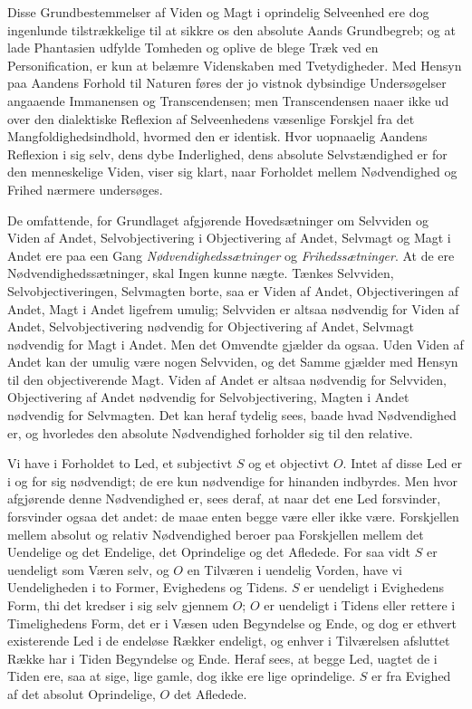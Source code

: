 \documentclass[12pt]{book}
\newcommand{\apage}[1]{\marginnote{\footnotesize\textit{[#1]}}}
\begin{document}
\apage{222} Disse Grundbestemmelser af Viden og Magt i oprindelig Selveenhed ere dog
ingenlunde tilstrækkelige til at sikkre os den absolute Aands Grundbegreb;
og at lade Phantasien udfylde Tomheden og oplive de blege Træk ved en
Personification, er kun at belæmre Videnskaben med Tvetydigheder. Med Hensyn
paa Aandens Forhold til Naturen føres der jo vistnok dybsindige
Undersøgelser angaaende Immanensen og Transcendensen; men Transcendensen
naaer ikke ud over den dialektiske Reflexion af Selveenhedens væsenlige
Forskjel fra det Mangfoldighedsindhold, hvormed den er identisk. Hvor
uopnaaelig Aandens Reflexion i sig selv, dens dybe Inderlighed, dens
absolute Selvstændighed er for den menneskelige Viden, viser sig klart,
naar Forholdet mellem Nødvendighed og Frihed nærmere undersøges.

De omfattende, for Grundlaget afgjørende Hovedsætninger om Selvviden og
Viden af Andet, Selvobjectivering i Objectivering af Andet, Selvmagt og Magt
i Andet ere paa een Gang \emph{Nødvendighedssætninger} og \emph{Frihedssætninger}. At de
ere Nødvendighedssætninger, skal Ingen kunne nægte. Tænkes Selvviden,
Selvobjectiveringen, Selvmagten borte, saa er Viden af Andet,
Objectiveringen af Andet, Magt i Andet ligefrem umulig; Selvviden er altsaa
nødvendig for Viden af Andet, Selvobjectivering nødvendig for Objectivering
af Andet, Selvmagt nødvendig for Magt i Andet. Men det Omvendte gjælder da
ogsaa. Uden Viden af Andet kan der umulig være nogen Selvviden, og det Samme
gjælder med Hensyn til den objectiverende \apage{223} Magt. Viden af Andet er altsaa
nødvendig for Selvviden, Objectivering af Andet nødvendig for
Selvobjectivering, Magten i Andet nødvendig for Selvmagten. Det kan heraf
tydelig sees, baade hvad Nødvendighed er, og hvorledes den absolute
Nødvendighed forholder sig til den relative.

Vi have i Forholdet to Led, et subjectivt $S$ og et objectivt $O$. Intet af
disse Led er i og for sig nødvendigt; de ere kun nødvendige for hinanden
indbyrdes. Men hvor afgjørende denne Nødvendighed er, sees deraf, at naar
det ene Led forsvinder, forsvinder ogsaa det andet: de maae enten begge
være eller ikke være. Forskjellen mellem absolut og relativ Nødvendighed
beroer paa Forskjellen mellem det Uendelige og det Endelige, det
Oprindelige og det Afledede. For saa vidt $S$ er uendeligt som Væren selv,
og $O$ en Tilværen i uendelig Vorden, have vi Uendeligheden i to Former,
Evighedens og Tidens. $S$ er uendeligt i Evighedens Form, thi det kredser i
sig selv gjennem $O$; $O$ er uendeligt i Tidens eller rettere i
Timelighedens Form, det er i Væsen uden Begyndelse og Ende, og dog er
ethvert existerende Led i de endeløse Rækker endeligt, og enhver i
Tilværelsen afsluttet Række har i Tiden Begyndelse og Ende. Heraf sees, at
begge Led, uagtet de i Tiden ere, saa at sige, lige gamle, dog ikke ere
lige oprindelige. $S$ er fra Evighed af det absolut Oprindelige, $O$ det
Afledede.
\end{document}
